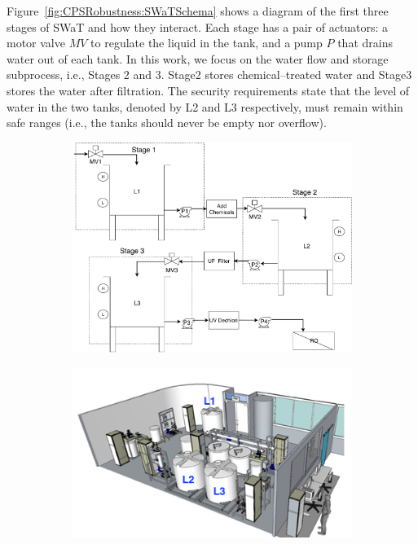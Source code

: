 {Figure~\ref{fig:CPSRobustness:SWaTSchema} shows a diagram of the first three stages of SWaT and how they interact. 
Each stage has a pair of actuators: a motor valve $MV$ to regulate the liquid in the tank, and a pump $P$ that drains water out of each tank.
In this work, we focus on the water flow and storage subprocess, i.e., Stages 2 and 3. %
Stage2 stores chemical--treated water and Stage3 stores the water after filtration. The security requirements state that the level of water in the two tanks, denoted by L2 and L3 respectively, must remain within safe ranges (i.e., the tanks should never be empty nor overflow).
\begin{figure}[htb]
  \centering
  \begin{subfigure}[b]{.65\linewidth}
  \includegraphics[width=\linewidth]{Figures/SWaT_allTanks-Stages}
  \end{subfigure}
  \begin{subfigure}[b]{.35\linewidth}
  \includegraphics[width=\linewidth]{Figures/testbed.png}

\end{subfigure}
\end{figure}}

